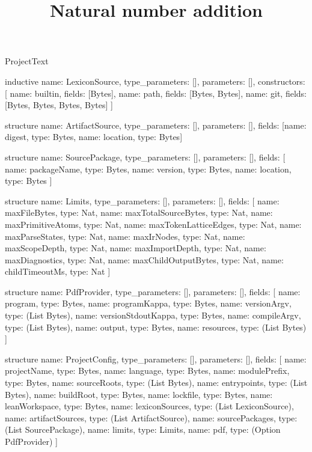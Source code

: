 \begin{lexlean}{ProjectText}
\title{Natural number addition}
\begin{semanticmodule}
inductive{
  name: LexiconSource,
  type_parameters: [],
  parameters: [],
  constructors: [
    {name: builtin, fields: [Bytes]},
    {name: path, fields: [Bytes, Bytes]},
    {name: git, fields: [Bytes, Bytes, Bytes, Bytes]}
  ]
}

structure{
  name: ArtifactSource,
  type_parameters: [],
  parameters: [],
  fields: [{name: digest, type: Bytes}, {name: location, type: Bytes}]
}

structure{
  name: SourcePackage,
  type_parameters: [],
  parameters: [],
  fields: [
    {name: packageName, type: Bytes},
    {name: version, type: Bytes},
    {name: location, type: Bytes}
  ]
}

structure{
  name: Limits,
  type_parameters: [],
  parameters: [],
  fields: [
    {name: maxFileBytes, type: Nat},
    {name: maxTotalSourceBytes, type: Nat},
    {name: maxPrimitiveAtoms, type: Nat},
    {name: maxTokenLatticeEdges, type: Nat},
    {name: maxParseStates, type: Nat},
    {name: maxIrNodes, type: Nat},
    {name: maxScopeDepth, type: Nat},
    {name: maxImportDepth, type: Nat},
    {name: maxDiagnostics, type: Nat},
    {name: maxChildOutputBytes, type: Nat},
    {name: childTimeoutMs, type: Nat}
  ]
}

structure{
  name: PdfProvider,
  type_parameters: [],
  parameters: [],
  fields: [
    {name: program, type: Bytes},
    {name: programKappa, type: Bytes},
    {name: versionArgv, type: (List Bytes)},
    {name: versionStdoutKappa, type: Bytes},
    {name: compileArgv, type: (List Bytes)},
    {name: output, type: Bytes},
    {name: resources, type: (List Bytes)}
  ]
}

structure{
  name: ProjectConfig,
  type_parameters: [],
  parameters: [],
  fields: [
    {name: projectName, type: Bytes},
    {name: language, type: Bytes},
    {name: modulePrefix, type: Bytes},
    {name: sourceRoots, type: (List Bytes)},
    {name: entrypoints, type: (List Bytes)},
    {name: buildRoot, type: Bytes},
    {name: lockfile, type: Bytes},
    {name: leanWorkspace, type: Bytes},
    {name: lexiconSources, type: (List LexiconSource)},
    {name: artifactSources, type: (List ArtifactSource)},
    {name: sourcePackages, type: (List SourcePackage)},
    {name: limits, type: Limits},
    {name: pdf, type: (Option PdfProvider)}
  ]
}


\end{semanticmodule}
\end{lexlean}
